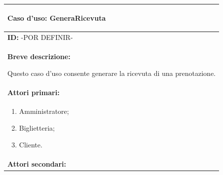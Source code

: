 \documentclass{article}
\begin{document}
                \begin{table}[t]
                    \centering
                    \begin{tabular}{|p{\linewidth}|}
                        \hline
                        \cellcolor{gray!100}
                        \color{white}
                        \begin{center}
                            \textbf{Caso d'uso:} GeneraRicevuta
                        \end{center} \\
                        \hline
                        \textbf{ID:} -POR DEFINIR- \\
                        \hline
                        \cellcolor{gray!20}
                        \textbf{Breve descrizione:}

                        Questo caso d'uso consente generare la ricevuta di una prenotazione. \\
                        \hline
                        \textbf{Attori primari:} \\
                        \begin{minipage}{\linewidth}
                            \begin{enumerate}[noitemsep]
                                \item Amministratore;
                                \item Biglietteria;
                                \item Cliente.
                            \end{enumerate}
                        \end{minipage}
                        \vspace{0pt} \\
                        \hline
                        \textbf{Attori secondari:}


\end{tabular}
\end{table}
\end{document}
